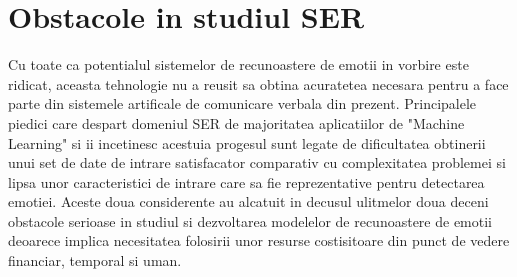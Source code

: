 \documentclass[a4paper,12pt]{book}
\begin{document}
			\section{Obstacole in studiul SER}	\label{obstacole}	
				Cu toate ca potentialul sistemelor de recunoastere de emotii in vorbire este ridicat, aceasta tehnologie nu a reusit sa obtina acuratetea necesara pentru a face parte din sistemele artificale de comunicare verbala din prezent. Principalele piedici care despart domeniul SER de majoritatea aplicatiilor de "Machine Learning" si ii incetinesc acestuia progesul sunt legate de dificultatea obtinerii unui set de date de intrare satisfacator comparativ cu complexitatea problemei si lipsa unor caracteristici de intrare care sa fie reprezentative pentru detectarea emotiei. Aceste doua considerente au alcatuit in decusul ulitmelor doua deceni obstacole serioase in studiul si dezvoltarea modelelor de recunoastere de emotii deoarece implica necesitatea folosirii unor resurse costisitoare din punct de vedere financiar, temporal si uman.\par
				
\end{document}
